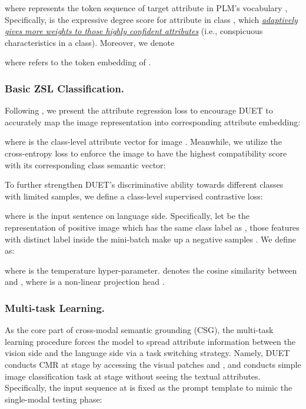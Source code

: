 \documentclass[letterpaper]{article} \usepackage{aaai23}  \usepackage{times}  \usepackage{helvet}  \usepackage{courier}  \usepackage[hyphens]{url}  \usepackage{graphicx} \urlstyle{rm} \def\UrlFont{\rm}  \usepackage{natbib}  \usepackage{caption} \frenchspacing  \setlength{\pdfpagewidth}{8.5in}  \setlength{\pdfpageheight}{11in}  \usepackage{algorithm}
\newcommand{\wen}[1]{{\color{black}#1}}
\begin{document}
where  represents the token sequence of target attribute  
\wen{in}
PLM's vocabulary , 
Specifically,  is the expressive degree score for attribute   in class , 
which \ul{\emph{adaptively gives more weights to 
 those 
highly confident attributes}} (i.e., conspicuous characteristics in a class).
Moreover, we denote  

where  refers to the token embedding of .

\subsubsection{\textbf{Basic ZSL Classification.}}
Following \cite{Chen2021TransZero,DBLP:conf/nips/XuXWSA20}, we present the attribute regression loss
 to encourage DUET to accurately map the image representation into  corresponding attribute embedding:

where  is the class-level attribute vector for image .
Meanwhile,
we utilize the cross-entropy loss to enforce the image to have the highest compatibility score with its corresponding class semantic vector:

To further strengthen DUET's discriminative ability towards different classes with limited samples, we define a class-level supervised contrastive loss:

where  is the input sentence on language side.
Specifically, let  be the representation of positive image which has the same class label as , those features with distinct label inside the mini-batch make up a negative samples . We define  as:

where  is the temperature hyper-parameter.  denotes the cosine similarity between  and , where  is a non-linear projection head \cite{DBLP:conf/icml/ChenK0H20}.


\subsubsection{\textbf{Multi-task Learning.} }
As the core part of cross-modal semantic grounding (CSG), 
the multi-task learning procedure \cite{DBLP:conf/nips/SenerK18,DBLP:conf/cvpr/WhiteheadWJFS21} forces the model to spread attribute information between the {vision side and the language side via a} task switching strategy. 
{Namely,} DUET conducts CMR at stage  by accessing the visual patches and , {and conducts} simple image classification task at stage  without seeing {the} textual attributes. 
Specifically,  
the input sequence  at  {is}
fixed as the prompt template to mimic the single-modal testing phase:
\end{document}
